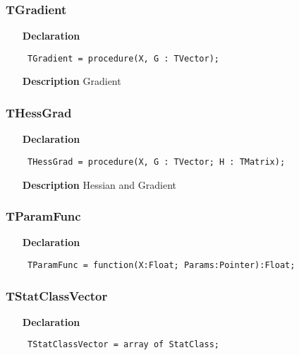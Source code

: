 \documentclass[12pt,a4paper,oneside]{report}
\newcommand{\lmath}[1]{   %
	\marginpar{\vspace{#1} 
		\begin{flushright}
			LMath
	\end{flushright} }
}
\newcommand{\declarationitem}[1]{\textbf{#1}}
\newcommand{\descriptiontitle}[1]{\textbf{#1}}
\newcommand{\code}[1]{\texttt{#1}}
\begin{document}
\subsubsection{TGradient}
\label{utypes-TGradient}
\begin{itemize}\item[\declarationitem{Declaration}\hfill]
	\begin{flushleft}
		\code{
			TGradient = procedure(X, G : TVector);}
		
	\end{flushleft}
	
	\par
	\item[\descriptiontitle{Description}]
	Gradient
	
\end{itemize}
\subsubsection{THessGrad}
\label{utypes-THessGrad}
\begin{itemize}\item[\declarationitem{Declaration}\hfill]
	\begin{flushleft}
		\code{
			THessGrad = procedure(X, G : TVector; H : TMatrix);}
		
	\end{flushleft}
	
	\par
	\item[\descriptiontitle{Description}]
	Hessian and Gradient
	
\end{itemize}
\subsubsection{TParamFunc}
\lmath{-24pt}
\label{utypes-TParamFunc}
\begin{itemize}\item[\declarationitem{Declaration}\hfill]
	\begin{flushleft}
		\code{
			TParamFunc = function(X:Float; Params:Pointer):Float;}
		
	\end{flushleft}
	
\end{itemize}

\subsubsection{TStatClassVector}
\label{utypes-TStatClassVector}
\begin{itemize}\item[\declarationitem{Declaration}\hfill]
	\begin{flushleft}
		\code{
			TStatClassVector = array of StatClass;}
		
	\end{flushleft}
	
\end{itemize}
\end{document}
